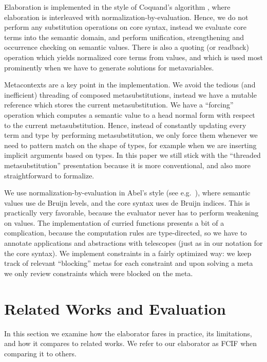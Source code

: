 \documentclass[acmsmall,review,anonymous,prologue,dvipsnames]{acmart}\settopmatter{printfolios=true,printccs=false,printacmref=false}
\theoremstyle{remark}
\begin{document}
Elaboration is implemented in the style of Coquand's algorithm
\cite{coquand1996algorithm}, where elaboration is interleaved with
normalization-by-evaluation. Hence, we do not perform any substitution
operations on core syntax, instead we evaluate core terms into the semantic
domain, and perform unification, strengthening and occurrence checking on
semantic values. There is also a quoting (or readback) operation which yields
normalized core terms from values, and which is used most prominently when we
have to generate solutions for metavariables.

Metacontexts are a key point in the implementation. We avoid the tedious (and
inefficient) threading of composed metasubstitutions, instead we have a mutable
reference which stores the current metasubstitution. We have a ``forcing''
operation which computes a semantic value to a head normal form with respect to
the current metasubstitution. Hence, instead of constantly updating every term
and type by performing metasubstitution, we only force them whenever we need to
pattern match on the shape of types, for example when we are inserting implicit
arguments based on types. In this paper we still stick with the ``threaded
metasubstitution'' presentation because it is more conventional, and also more
straightforward to formalize.

We use normalization-by-evaluation in Abel's style (see
e.g.\ \cite[Chapter~3]{abel2013normalization}), where semantic values use de
Bruijn levels, and the core syntax uses de Bruijn indices. This is practically
very favorable, because the evaluator never has to perform weakening on values.
The implementation of curried functions presents a bit of a complication,
because the computation rules are type-directed, so we have to annotate
applications and abstractions with telescopes (just as in our notation for the
core syntax). We implement constraints in a fairly optimized way: we keep track
of relevant ``blocking'' metas for each constraint and upon solving a meta we
only review constraints which were blocked on the meta.

\section{Related Works and Evaluation}
\label{sec:impl_and_eval}

In this section we examine how the elaborator fares in practice, its
limitations, and how it compares to related works. We refer to our elaborator as
FCIF when comparing it to others.
\end{document}
